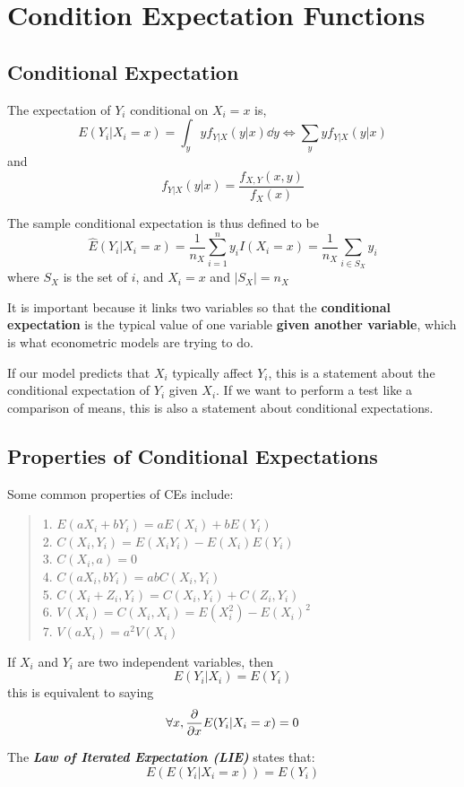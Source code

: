 \section{Condition Expectation Functions}
\subsection{Conditional Expectation}
The expectation of $Y_i$ conditional on $X_i = x$ is,
$$E(Y_i | X_i = x) = \int_y y f_{Y|X}(y | x) \dd y \iff \sum_y y f_{Y|X}(y | x)$$
and
$$f_{Y|X}(y | x) = \frac{f_{X, Y}(x, y)}{f_X(x)}$$

The sample conditional expectation is thus defined to be
$$\hat{E}(Y_i | X_i = x) = \frac{1}{n_X} \sum_{i=1}^{n} y_i I(X_i = x) = \frac{1}{n_X} \sum_{i \in S_X} y_i$$
where $S_X$ is the set of $i$, and $X_i = x$ and $|S_X| = n_X$

It is important because it links two variables so that the \textbf{conditional expectation} is the typical value of one variable \textbf{given another variable}, which is what econometric models are trying to do.

If our model predicts that $X_i$ typically affect $Y_i$, this is a statement about the conditional expectation of $Y_i$ given $X_i$. If we want to perform a test like a comparison of means, this is also a statement about conditional expectations.

\subsection{Properties of Conditional Expectations}
Some common properties of CEs include:
\begin{quote}
    1. $E(aX_i + bY_i) = aE(X_i) + bE(Y_i)$ \\
    2. $C(X_i, Y_i) = E(X_iY_i) - E(X_i)E(Y_i)$ \\
    3. $C(X_i, a) = 0$ \\
    4. $C(aX_i, bY_i) = abC(X_i, Y_i)$ \\
    5. $C(X_i + Z_i, Y_i) = C(X_i, Y_i) + C(Z_i, Y_i)$ \\
    6. $V(X_i) = C(X_i, X_i) = E(X_i^2) - E(X_i)^2$ \\
    7. $V(aX_i) = a^2V(X_i)$
\end{quote}
If $X_i$ and $Y_i$ are two independent variables, then
$$E(Y_i | X_i) = E(Y_i)$$
this is equivalent to saying 
$$\forall x, \pdv{x} E(Y_i | X_i = x) = 0$$

\begin{theorem}
    The \textbf{\textit{Law of Iterated Expectation (LIE)}} states that:
    $$E(E(Y_i|X_i = x)) = E(Y_i)$$
\end{theorem}

